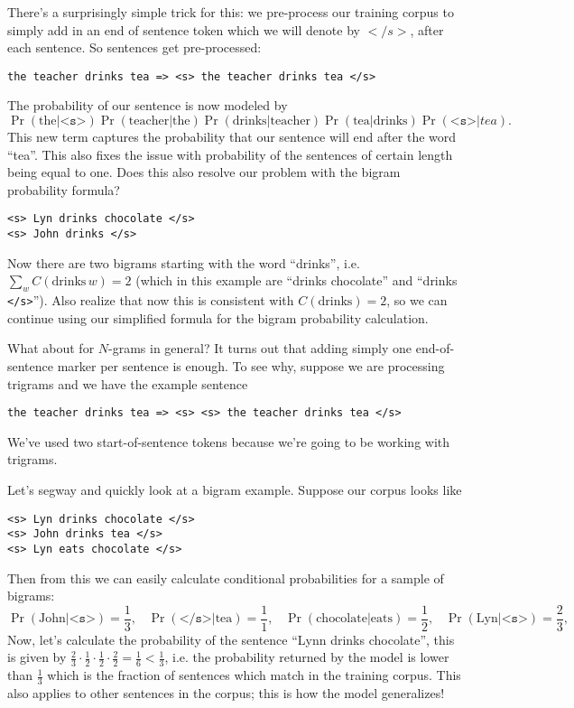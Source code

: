 \documentclass[12pt]{article}
\begin{document}
There's a surprisingly simple trick for this: we pre-process our training corpus to simply add in an end of sentence token which we will denote by $</s>$, after each sentence. So sentences get pre-processed:
\begin{verbatim}
the teacher drinks tea => <s> the teacher drinks tea </s>
\end{verbatim}
The probability of our sentence is now modeled by
\[
  \Pr(\textrm{the} | \texttt{<s>}) \Pr(\textrm{teacher} | \textrm{the}) \Pr(\textrm{drinks} | \textrm{teacher}) \Pr(\textrm{tea} | \textrm{drinks}) \Pr(\texttt{<s>} | tea).
\]
This new term captures the probability that our sentence will end after the word ``tea''. This also fixes the issue with probability of the sentences of certain length being equal to one. Does this also resolve our problem with the bigram probability formula?
\begin{verbatim}
<s> Lyn drinks chocolate </s>
<s> John drinks </s>
\end{verbatim}
Now there are two bigrams starting with the word ``drinks'', i.e. $\sum_w C(\textrm{drinks} \, w) = 2$ (which in this example are ``drinks chocolate'' and ``drinks \texttt{</s>}''). Also realize that now this is consistent with $C(\textrm{drinks}) = 2$, so we can continue using our simplified formula for the bigram probability calculation.

What about for $N$-grams in general? It turns out that adding simply one end-of-sentence marker per sentence is enough. To see why, suppose we are processing trigrams and we have the example sentence
\begin{verbatim}
the teacher drinks tea => <s> <s> the teacher drinks tea </s>
\end{verbatim}
We've used two start-of-sentence tokens because we're going to be working with trigrams.

Let's segway and quickly look at a bigram example. Suppose our corpus looks like
\begin{verbatim}
<s> Lyn drinks chocolate </s>
<s> John drinks tea </s>
<s> Lyn eats chocolate </s>
\end{verbatim}
Then from this we can easily calculate conditional probabilities for a sample of bigrams:
\[
  \Pr(\textrm{John} | \texttt{<s>}) = \frac{1}{3}, \hspace{10pt}
  \Pr(\texttt{</s>} | \textrm{tea}) = \frac{1}{1}, \hspace{10pt}
  \Pr(\textrm{chocolate} | \textrm{eats}) = \frac{1}{2}, \hspace{10pt}
  \Pr(\textrm{Lyn} | \texttt{<s>}) = \frac{2}{3}, \hspace{10pt}
\]
Now, let's calculate the probability of the sentence ``Lynn drinks chocolate'', this is given by $\frac{2}{3} \cdot \frac{1}{2} \cdot \frac{1}{2} \cdot \frac{2}{2} = \frac{1}{6} < \frac{1}{3}$, i.e. the probability returned by the model is lower than $\frac{1}{3}$ which is the fraction of sentences which match in the training corpus. This also applies to other sentences in the corpus; this is how the model generalizes!
\end{document}
